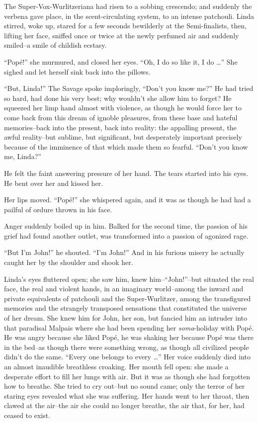 \documentclass[12pt]{report}
\begin{document}
The Super-Vox-Wurlitzeriana had risen to a sobbing crescendo; and
suddenly the verbena gave place, in the scent-circulating system, to an
intense patchouli. Linda stirred, woke up, stared for a few seconds
bewilderly at the Semi-finalists, then, lifting her face, sniffed once
or twice at the newly perfumed air and suddenly smiled--a smile of
childish ecstasy.

``Popé!'' she murmured, and closed her eyes. ``Oh, I do so like it, I do
\ldots{}'' She sighed and let herself sink back into the pillows.

``But, Linda!'' The Savage spoke imploringly, ``Don't you know me?'' He
had tried so hard, had done his very best; why wouldn't she allow him to
forget? He squeezed her limp hand almost with violence, as though he
would force her to come back from this dream of ignoble pleasures, from
these base and hateful memories--back into the present, back into
reality: the appalling present, the awful reality--but sublime, but
significant, but desperately important precisely because of the
imminence of that which made them so fearful. ``Don't you know me,
Linda?''

He felt the faint answering pressure of her hand. The tears started into
his eyes. He bent over her and kissed her.

Her lips moved. ``Popé!'' she whispered again, and it was as though he
had had a pailful of ordure thrown in his face.

Anger suddenly boiled up in him. Balked for the second time, the passion
of his grief had found another outlet, was transformed into a passion of
agonized rage.

``But I'm John!'' he shouted. ``I'm John!'' And in his furious misery he
actually caught her by the shoulder and shook her.

Linda's eyes fluttered open; she saw him, knew him--``John!''--but
situated the real face, the real and violent hands, in an imaginary
world--among the inward and private equivalents of patchouli and the
Super-Wurlitzer, among the transfigured memories and the strangely
transposed sensations that constituted the universe of her dream. She
knew him for John, her son, but fancied him an intruder into that
paradisal Malpais where she had been spending her \emph{soma}-holiday
with Popé. He was angry because she liked Popé, he was shaking her
because Popé was there in the bed--as though there were something wrong,
as though all civilized people didn't do the same. ``Every one belongs
to every \ldots{}'' Her voice suddenly died into an almost inaudible
breathless croaking. Her mouth fell open: she made a desperate effort to
fill her lungs with air. But it was as though she had forgotten how to
breathe. She tried to cry out--but no sound came; only the terror of her
staring eyes revealed what she was suffering. Her hands went to her
throat, then clawed at the air--the air she could no longer breathe, the
air that, for her, had ceased to exist.
\end{document}
